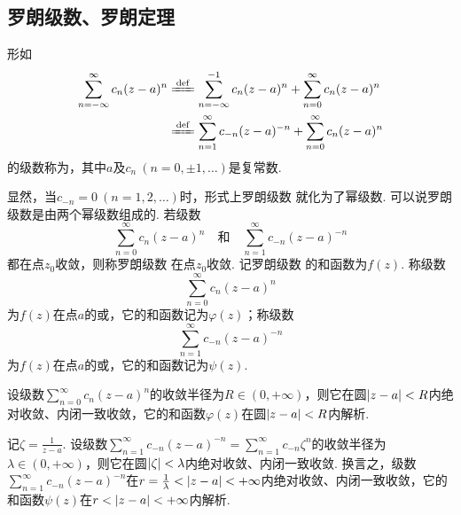 \subsection{罗朗级数、罗朗定理}
\begin{definition}
形如\begin{equation}\label{equation:解析函数的级数表示.罗朗级数}
\begin{split}
\sum\limits_{n=-\infty}^{\infty} c_n (z-a)^n
&\defeq \sum\limits_{n=-\infty}^{-1} c_n (z-a)^n + \sum\limits_{n=0}^{\infty} c_n (z-a)^n \\
&\defeq \sum\limits_{n=1}^{\infty} c_{-n} (z-a)^{-n} + \sum\limits_{n=0}^{\infty} c_n (z-a)^n
\end{split}
\end{equation}的级数称为，其中\(a\)及\(c_n\ (n=0,\pm1,\dotsc)\)是复常数.
\end{definition}
显然，当\(c_{-n}=0\ (n=1,2,\dotsc)\)时，形式上罗朗级数 就化为了幂级数.
可以说罗朗级数是由两个幂级数组成的.
若级数\[
\sum\limits_{n=0}^{\infty} c_n (z-a)^n
\quad\text{和}\quad
\sum\limits_{n=1}^{\infty} c_{-n} (z-a)^{-n}
\]都在点\(z_0\)收敛，则称罗朗级数 在点\(z_0\)收敛.
记罗朗级数 的和函数为\(f(z)\).
称级数\[
\sum\limits_{n=0}^{\infty} c_n (z-a)^n
\]为\(f(z)\)在点\(a\)的或，它的和函数记为\(\varphi(z)\)；称级数\[
\sum\limits_{n=1}^{\infty} c_{-n} (z-a)^{-n}
\]为\(f(z)\)在点\(a\)的或，它的和函数记为\(\psi(z)\).

设级数\(\sum\limits_{n=0}^{\infty} c_n (z-a)^n\)的收敛半径为\(R \in (0,+\infty)\)，则它在圆\(\abs{z-a}<R\)内绝对收敛、内闭一致收敛，它的和函数\(\varphi(z)\)在圆\(\abs{z-a}<R\)内解析.

记\(\zeta = \frac{1}{z-a}\).
设级数\(\sum\limits_{n=1}^{\infty} c_{-n} (z-a)^{-n} = \sum\limits_{n=1}^{\infty} c_{-n} \zeta^n\)的收敛半径为\(\lambda \in (0,+\infty)\)，则它在圆\(\abs{\zeta} < \lambda\)内绝对收敛、内闭一致收敛.
换言之，级数\(\sum\limits_{n=1}^{\infty} c_{-n} (z-a)^{-n}\)在\(r = \frac{1}{\lambda} < \abs{z-a} < +\infty\)内绝对收敛、内闭一致收敛，它的和函数\(\psi(z)\)在\(r < \abs{z-a} < +\infty\)内解析.

